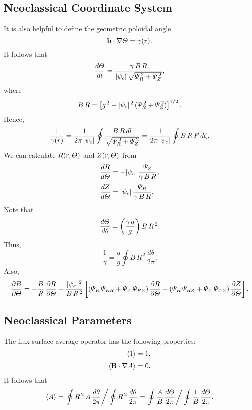 \documentclass[notitlepage,12pt]{article}
\begin{document}
\subsection{Neoclassical Coordinate System}
It is also helpful to define the geometric poloidal angle
\begin{equation}
{\bf b}\cdot\nabla {\mit\Theta} = \gamma(r).
\end{equation}
It follows that
\begin{equation}
\frac{d{\mit\Theta}}{dl} = \frac{\gamma\,B\,R}{|\psi_c|\,\sqrt{{\mit\Psi}_R^{\,2}+{\mit\Psi}_Z^{\,2}}},
\end{equation}
where
\begin{equation}
B\,R = \left[g^{\,2} + |\psi_c|^{\,2}\,({\mit\Psi}_R^{\,2}+{\mit\Psi}_Z^{\,2})\right]^{1/2}.
\end{equation}
Hence,
\begin{equation}
\frac{1}{\gamma(r)} = \frac{1}{2\pi\,|\psi_c|}\oint\frac{B\,R\,dl}{\sqrt{{\mit\Psi}_R^{\,2}+{\mit\Psi}_Z^{\,2}}}= \frac{1}{2\pi\,|\psi_c|}\oint B\,R\,F\,d\zeta.
\end{equation}
We can calculate $R(r,{\mit\Theta})$ and $Z(r,{\mit\Theta})$ from 
\begin{align}
\frac{dR}{d{\mit\Theta}} &=-|\psi_c|\,\frac{{\mit\Psi}_Z}{\gamma\,B\,R},\\[0.5ex]
\frac{dZ}{d{\mit\Theta}} &=|\psi_c|\,\frac{{\mit\Psi}_R}{\gamma\,B\,R}.
\end{align}
Note that
\begin{equation}
\frac{d{\mit\Theta}}{d\theta} = \left(\frac{\gamma\,q}{g}\right)B\,R^{\,2}.
\end{equation}
Thus,
\begin{equation}
\frac{1}{\gamma} = \frac{q}{g}\oint B\,R^{\,2}\,\frac{d\theta}{2\pi}.
\end{equation}
Also,
\begin{equation}
\frac{\partial B}{\partial{\mit\Theta}} = - \frac{B}{R}\,\frac{\partial R}{\partial{\mit\Theta}} + \frac{|\psi_c|^{\,2}}{B\,R^{\,2}}
\left[({\mit\Psi}_R\,{\mit\Psi}_{RR}+{\mit\Psi}_Z\,{\mit\Psi}_{RZ})\,\frac{\partial R}{\partial{\mit\Theta}}
+({\mit\Psi}_R\,{\mit\Psi}_{RZ}+{\mit\Psi}_Z\,{\mit\Psi}_{ZZ})\,\frac{\partial Z}{\partial{\mit\Theta}}\right].
\end{equation}

\subsection{Neoclassical Parameters}
The flux-surface average operator has the following
properties:
\begin{align}
\langle 1\rangle &= 1,\\[0.5ex]
\langle {\bf B}\cdot\nabla A\rangle &= 0.
\end{align}
It follows that
\begin{equation}\label{e140}
\langle A\rangle =\left.\oint R^{\,2}\,A\,\frac{d\theta}{2\pi}\right/\oint R^{\,2}\,\frac{d\theta}{2\pi}=\left.\oint
\frac{A}{B}\,\frac{d{\mit\Theta}}{2\pi}\right/\oint
\frac{1}{B}\,\frac{d{\mit\Theta}}{2\pi}.
\end{equation}
\end{document}
